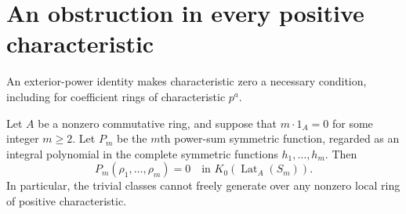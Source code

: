 \section{An obstruction in every positive characteristic}

An exterior-power identity makes characteristic zero a necessary
condition, including for coefficient rings of characteristic $p^a$.

\begin{proposition}\label{prop:positive-characteristic}
Let $A$ be a nonzero commutative ring, and suppose that $m\cdot1_A=0$
for some integer $m\geq2$.  Let $P_m$ be the $m$th power-sum
symmetric function, regarded as an integral polynomial in the
complete symmetric functions $h_1,\ldots,h_m$.  Then
\[
 P_m(\rho_1,\ldots,\rho_m)=0
 \quad\text{in }K_0(\operatorname{Lat}_A(S_m)).
\]
In particular, the trivial classes cannot freely generate over any
nonzero local ring of positive characteristic.
\end{proposition}

